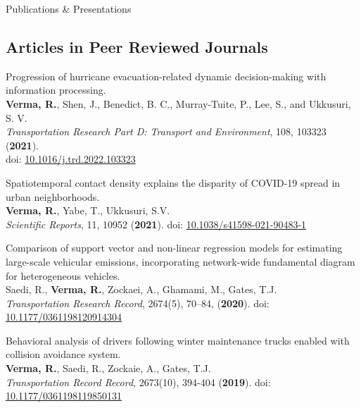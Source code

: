 \documentclass{CV} %
\begin{document}
\begin{rSection}{Publications \& Presentations}
    \subsection*{Articles in Peer Reviewed Journals}
    \begin{etaremune}
        \item Progression of hurricane evacuation-related dynamic decision-making with information processing.
        \\ \textbf{Verma, R.}, Shen, J., Benedict, B. C., Murray-Tuite, P., Lee, S., and Ukkusuri, S. V.
        \\ \textit{Transportation Research Part D: Transport and Environment}, 108, 103323 (\textbf{2021}).\\doi: \href{https://doi.org/10.1016/j.trd.2022.103323}{10.1016/j.trd.2022.103323}

        \item Spatiotemporal contact density explains the disparity of COVID-19 spread in urban neighborhoods.
        \\ \textbf{Verma, R.}, Yabe, T., Ukkusuri, S.V.
        \\ \textit{Scientific Reports}, 11, 10952 (\textbf{2021}). doi: \href{https://www.nature.com/articles/s41598-021-90483-1}{10.1038/s41598-021-90483-1}
    
        \item Comparison of support vector and non-linear regression models for estimating large-scale vehicular emissions, incorporating network-wide fundamental diagram for heterogeneous vehicles.
        \\ Saedi, R., \textbf{Verma, R.}, Zockaei, A., Ghamami, M., Gates, T.J.
        \\ \textit{Transportation Research Record}, 2674(5), 70–84, (\textbf{2020}). doi: \href{https://journals.sagepub.com/doi/abs/10.1177/0361198120914304}{10.1177/0361198120914304}
        
        \item Behavioral analysis of drivers following winter maintenance trucks enabled with collision avoidance system.
        \\ \textbf{Verma, R.}, Saedi, R., Zockaie, A., Gates, T.J.
        \\ \textit{Transportation Record Record}, 2673(10), 394-404 (\textbf{2019}). doi: \href{https://journals.sagepub.com/doi/abs/10.1177/0361198119850131}{10.1177/0361198119850131}
    \end{etaremune}
    

\end{rSection}
\end{document}
